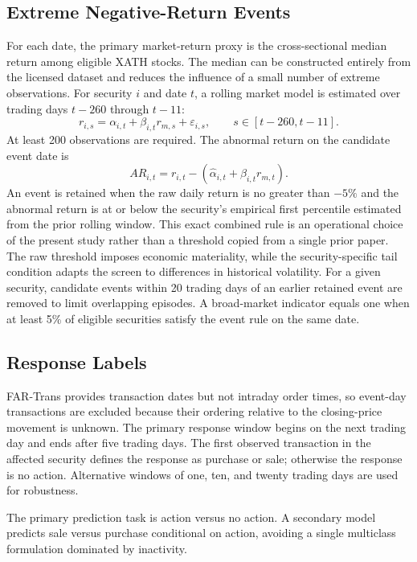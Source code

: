 \documentclass[conference]{IEEEtran}
\newcommand{\pct}{\%}
\begin{document}
\subsection{Extreme Negative-Return Events}
For each date, the primary market-return proxy is the cross-sectional median return among eligible XATH stocks. The median can be constructed entirely from the licensed dataset and reduces the influence of a small number of extreme observations. For security $i$ and date $t$, a rolling market model is estimated over trading days $t-260$ through $t-11$:
\begin{equation}
 r_{i,s}=\alpha_{i,t}+\beta_{i,t}r_{m,s}+\varepsilon_{i,s},
 \qquad s\in[t-260,t-11].
\end{equation}
At least 200 observations are required. The abnormal return on the candidate event date is
\begin{equation}
 AR_{i,t}=r_{i,t}-\left(\widehat{\alpha}_{i,t}+\widehat{\beta}_{i,t}r_{m,t}\right).
\end{equation}
An event is retained when the raw daily return is no greater than $-5\pct{}$ and the abnormal return is at or below the security's empirical first percentile estimated from the prior rolling window. This exact combined rule is an operational choice of the present study rather than a threshold copied from a single prior paper. The raw threshold imposes economic materiality, while the security-specific tail condition adapts the screen to differences in historical volatility. For a given security, candidate events within 20 trading days of an earlier retained event are removed to limit overlapping episodes. A broad-market indicator equals one when at least 5\pct{} of eligible securities satisfy the event rule on the same date.

\subsection{Response Labels}
FAR-Trans provides transaction dates but not intraday order times, so event-day transactions are excluded because their ordering relative to the closing-price movement is unknown. The primary response window begins on the next trading day and ends after five trading days. The first observed transaction in the affected security defines the response as purchase or sale; otherwise the response is no action. Alternative windows of one, ten, and twenty trading days are used for robustness.

The primary prediction task is action versus no action. A secondary model predicts sale versus purchase conditional on action, avoiding a single multiclass formulation dominated by inactivity.
\end{document}

